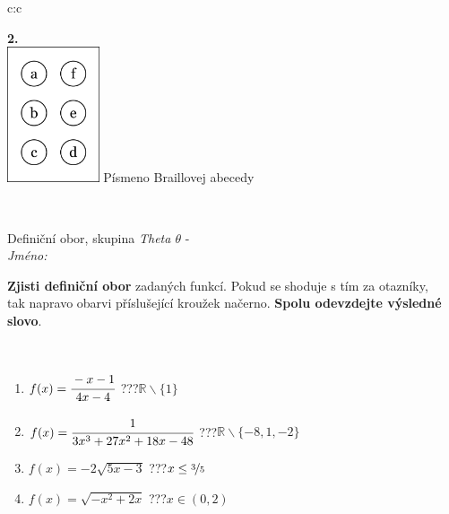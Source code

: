 \documentclass[10pt]{report}
\begin{document}
\begin{tabular}{c:c}
\begin{minipage}[c][104.5mm][t]{0.5\linewidth}
\begin{center}
\begin{minipage}{0.20\linewidth}
\begin{center}
{\Huge\bfseries 2.} \\[2mm]
\includegraphics[height=40mm]{../images/braille.png}
{\small Písmeno Braillovej abecedy}
\end{center}
\end{minipage}
\end{center}
\end{minipage}
\\ \hdashline
\begin{minipage}[c][104.5mm][t]{0.5\linewidth}
\begin{center}
\vspace{7mm}
{\huge Definiční obor, skupina \textit{Theta $\theta$} -}\\[5mm]
\textit{Jméno:}\phantom{xxxxxxxxxxxxxxxxxxxxxxxxxxxxxxxxxxxxxxxxxxxxxxxxxxxxxxxxxxxxxxxxx}\\[5mm]
\begin{minipage}{0.95\linewidth}
\begin{center}
\textbf{Zjisti definiční obor} zadaných funkcí. Pokud se shoduje s tím za otazníky,\\tak napravo obarvi příslušející kroužek načerno. \textbf{Spolu odevzdejte výsledné slovo}.
\end{center}
\end{minipage}
\\[1mm]
\begin{minipage}{0.79\linewidth}
\begin{center}
\begin{varwidth}{\linewidth}
\begin{enumerate}
\normalsizerrr
\item $f(x)=\cfrac{-x-1}{4x-4}$\quad \dotfill\; ???\;\dotfill \quad $\mathbb{R}\smallsetminus\{1\}$
\item $f(x)=\cfrac{1}{3x^3+27x^2+18x-48}$\quad \dotfill\; ???\;\dotfill \quad $\mathbb{R}\smallsetminus\{-8,1,-2\}$
\item $f(x)=-2\sqrt{5x-3}$\quad \dotfill\; ???\;\dotfill \quad $x\leq\nicefrac{3}{5}$
\item $f(x)=\sqrt{-x^2+2x}$\quad \dotfill\; ???\;\dotfill \quad $x\in(0 , 2)$

\end{enumerate}
\end{varwidth}
\end{center}
\end{minipage}
\end{center}
\end{minipage}
\end{tabular}
\end{document}
